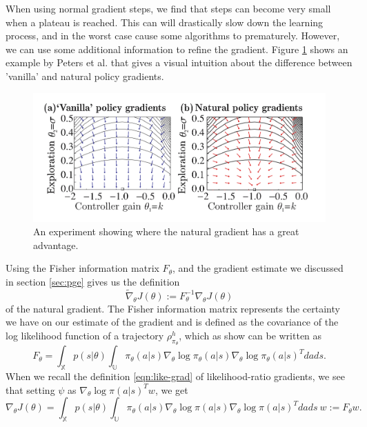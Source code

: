 When using normal gradient steps, we find that steps can become very small when a plateau is reached. This can will drastically slow down the learning process, and in the worst case cause some algorithms to prematurely. However, we can use some additional information to refine the gradient. Figure \ref{fig:nat-grad-adv} shows an example by Peters et al. \cite{Peters_IICHR_2003} that gives a visual intuition about the difference between 'vanilla' and natural policy gradients. 

\begin{figure}
  \includegraphics[width=\textwidth]{nat-grad-adv}
  \caption{An experiment showing where the natural gradient has a great advantage. \cite{Peters_IICHR_2003} }\label{fig:nat-grad-adv}
\end{figure}

Using the Fisher information matrix $F_\theta$, and the gradient estimate we discussed in section \ref{sec:pge} gives us the definition
\begin{equation}
  \widetilde{\nabla}_\theta J(\theta) := F^{-1}_\theta \nabla_\theta J(\theta)
  \label{eqn:nat-grad}
\end{equation}
of the natural gradient. The Fisher information matrix represents the certainty we have on our estimate of the gradient and is defined as the covariance of the log likelihood function of a trajectory $\rho_{\pi_\theta}^h$, which as \cite{4863} show can be written as 
\begin{equation}
  F_\theta = \int_\mathbb{X} p(s|\theta) \int_\mathbb{U} \pi_\theta(a|s) \nabla_\theta \log{\pi_\theta(a|s)} \nabla_\theta \log{\pi_\theta(a|s)}^T dads.
  \label{eqn:F}
\end{equation}
When we recall the definition \eqref{eqn:like-grad} of likelihood-ratio gradients, we see that setting $\psi$ as $\nabla_\theta \log \pi(a|s)^T w$, we get
\begin{equation}
  \nabla_\theta J(\theta) = \int_\mathbb{X} {p(s|\theta) \int_\mathbb{U} \pi_\theta(a|s) \nabla_\theta \log \pi(a|s) {\nabla_\theta \log \pi(a|s)}^T dads}\ w := F_\theta w.
  \label{eqn:J-equals-F}
\end{equation}

